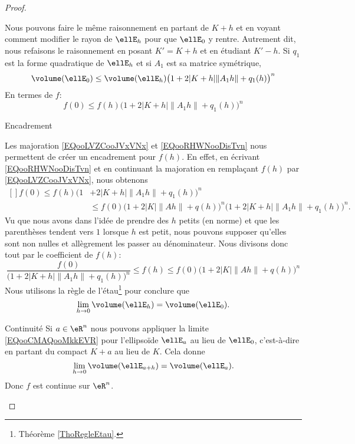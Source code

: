 \begin{proof}
\begin{subproof}
            Nous pouvons faire le même raisonnement en partant de \( K+h\) et en voyant comment modifier le rayon de \( \ellE_h\) pour que \( \ellE_0\) y rentre. Autrement dit, nous refaisons le raisonnement en posant \( K'=K+h\) et en étudiant \( K'-h\). Si \( q_1\) est la forme quadratique de \( \ellE_h\) et si \( A_1\) est sa matrice symétrique,
            \begin{equation}
                \volume(\ellE_0)\leq \volume(\ellE_h)\big( 1+2| K+h |\| A_1h \|+q_1(h) \big)^n
            \end{equation}
            En termes de \( f\):
            \begin{equation}        \label{EQooRHWNooDisTvn}
                f(0)\leq f(h) \big( 1+2| K+h |\| A_1h \|+q_1(h) \big)^n
            \end{equation}
        \item[Encadrement]

            Les majoration \eqref{EQooLVZCooJVxVNx} et \eqref{EQooRHWNooDisTvn} nous permettent de créer un encadrement pour \( f(h)\). En effet, en écrivant \eqref{EQooRHWNooDisTvn} et en continuant la majoration en remplaçant \( f(h)\) par \eqref{EQooLVZCooJVxVNx}, nous obtenons
            \begin{equation}
                \begin{aligned}[]
                    f(0)\leq f(h) \big( 1&+2| K+h |\| A_1h \|+q_1(h) \big)^n\\
                    &\leq f(0)\big( 1+2| K |\| Ah \|+q(h) \big)^n \big( 1+2| K+h |\| A_1h \|+q_1(h) \big)^n.
                \end{aligned}
            \end{equation}
            Vu que nous avons dans l'idée de prendre des \( h\) petits (en norme) et que les parenthèses tendent vers \( 1\) lorsque \( h\) est petit, nous pouvons supposer qu'elles sont non nulles et allègrement les passer au dénominateur. Nous divisons donc tout par le coefficient de \( f(h)\):
            \begin{equation}
                \frac{ f(0) }{  \big( 1+2| K+h |\| A_1h \|+q_1(h) \big)^n }\leq f(h)\leq f(0)  \big( 1+2| K |\| Ah \|+q(h) \big)^n
            \end{equation}
            Nous utilisons la règle de l'étau\footnote{Théorème \ref{ThoRegleEtau}.} pour conclure que
            \begin{equation}        \label{EQooCMAQooMkkEVR}
                \lim_{h\to 0} \volume(\ellE_h)=\volume(\ellE_0).
            \end{equation}
        \item[Continuité]
            Si \( a\in \eR^n\) nous pouvons appliquer la limite \eqref{EQooCMAQooMkkEVR} pour l'ellipsoïde \( \ellE_a\) au lieu de \( \ellE_0\), c'est-à-dire en partant du compact \( K+a\) au lieu de \( K\). Cela donne
            \begin{equation}
                \lim_{h\to 0} \volume(\ellE_{a+h})=\volume(\ellE_a).
            \end{equation}
            Donc \( f\) est continue sur \( \eR^n\).


\end{subproof}
\end{proof}
